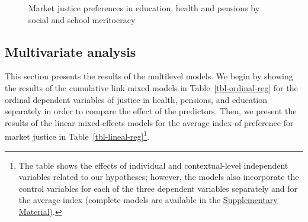 \documentclass[
  12pt,
  letterpaper,
]{article}
\begin{document}
\begin{figure}


\caption{\label{fig-bivariate}Market justice preferences in education,
health and pensions by social and school meritocracy}

\end{figure}%

\subsection{Multivariate analysis}\label{multivariate-analysis}

This section presents the results of the multilevel models. We begin by
showing the results of the cumulative link mixed models in
Table~\ref{tbl-ordinal-reg} for the ordinal dependent variables of
justice in health, pensions, and education separately in order to
compare the effect of the predictors. Then, we present the results of
the linear mixed-effects models for the average index of preference for
market justice in Table~\ref{tbl-lineal-reg}\footnote{The table shows
  the effects of individual and contextual-level independent variables
  related to our hypotheses; however, the models also incorporate the
  control variables for each of the three dependent variables separately
  and for the average index (complete models are available in the
  \hyperref[appendix]{Supplementary Material}).}.
\end{document}
